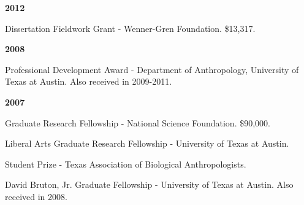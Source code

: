\documentclass{article}
\begin{document}
\begin{description*}
\item[] {\bfseries 2012}
\item[] Dissertation Fieldwork Grant - Wenner-Gren Foundation. \$13,317.
\end{description*}

\begin{description*}
\item[] {\bfseries 2008}
\item[] Professional Development Award - Department of Anthropology, University of Texas at Austin. Also received in 2009-2011.
\end{description*}

\begin{description*}
\item[] {\bfseries 2007}
\item[] Graduate Research Fellowship - National Science Foundation. \$90,000.

\item[] Liberal Arts Graduate Research Fellowship - University of Texas at Austin.

\item[] Student Prize - Texas Association of Biological Anthropologists.

\item[] David Bruton, Jr. Graduate Fellowship - University of Texas at Austin. Also received in 2008.
\end{description*}
\end{document}

